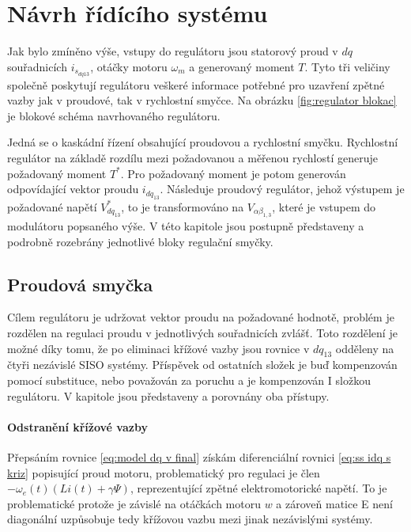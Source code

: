 \chapter{Návrh řídícího systému}
Jak bylo zmíněno výše, vstupy do regulátoru jsou statorový proud v $dq$ souřadnicích $i_{s_{dq13}}$, otáčky motoru $\omega_m$ a generovaný moment $T$. Tyto tři veličiny společně poskytují regulátoru veškeré informace potřebné pro uzavření zpětné vazby jak v proudové, tak v rychlostní smyčce. Na obrázku \ref{fig:regulator blokac} je blokové schéma navrhovaného regulátoru.

Jedná se o kaskádní řízení obsahující proudovou a rychlostní smyčku. Rychlostní regulátor na základě rozdílu mezi požadovanou a měřenou rychlostí generuje požadovaný moment $T^*$. Pro požadovaný moment je potom generován odpovídající vektor proudu $i_{dq_{13}}$. Následuje proudový regulátor, jehož výstupem je požadované napětí $V^*_{dq_13}$, to je transformováno na $V_{\alpha \beta_{1,3}}$, které je vstupem do modulátoru popsaného výše. V této kapitole jsou postupně představeny a podrobně rozebrány jednotlivé bloky regulační smyčky. 




\section{Proudová smyčka}
Cílem regulátoru je udržovat vektor proudu na požadované hodnotě, problém je rozdělen na regulaci proudu v jednotlivých souřadnicích zvlášť. Toto rozdělení je možné díky tomu, že po eliminaci křížové vazby jsou rovnice v $dq_{13}$ odděleny na čtyři nezávislé SISO systémy. Příspěvek od ostatních složek je buď kompenzován pomocí substituce, nebo považován za poruchu a je kompenzován I složkou regulátoru. V kapitole jsou představeny a porovnány oba přístupy.

\subsubsection{Odstranění křížové vazby}
Přepsáním rovnice \ref{eq:model dq v final} získám diferenciální rovnici \ref{eq:ss idq s kriz} popisující proud motoru, problematický pro regulaci je člen  $- \omega_e(t) \left( Li(t) + \gamma \Psi\right)$,  reprezentující zpětné elektromotorické napětí. To je problematické protože je závislé na otáčkách motoru $w$ a zároveň matice E není diagonální uzpůsobuje tedy křížovou vazbu mezi jinak nezávislými systémy. 

